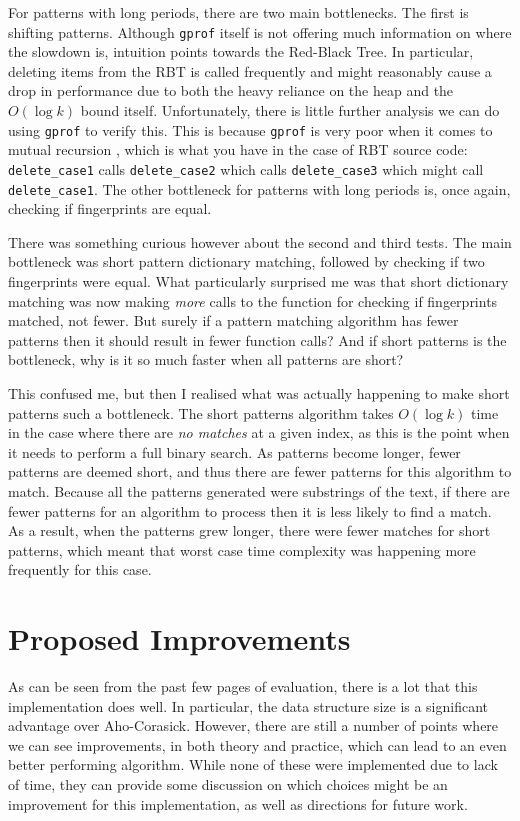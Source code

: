 \documentclass[ %
                    author={Dominic Joseph Moylett},
                    degree={MEng},
                     title={Dictionary Matching with Fingerprints},
                  subtitle={An Empirical Analysis},
                      type={research},
                      year={2015} ]{dissertation}
\begin{document}
For patterns with long periods, there are two main bottlenecks. The first is shifting patterns. Although \texttt{gprof} itself is not offering much information on where the slowdown is, intuition points towards the Red-Black Tree. In particular, deleting items from the RBT is called frequently and might reasonably cause a drop in performance due to both the heavy reliance on the heap and the $O(\log k)$ bound itself. Unfortunately, there is little further analysis we can do using \texttt{gprof} to verify this. This is because \texttt{gprof} is very poor when it comes to mutual recursion \cite{SPE:SPE562}, which is what you have in the case of RBT source code: \texttt{delete\_case1} calls \texttt{delete\_case2} which calls \texttt{delete\_case3} which might call \texttt{delete\_case1}. The other bottleneck for patterns with long periods is, once again, checking if fingerprints are equal.

There was something curious however about the second and third tests. The main bottleneck was short pattern dictionary matching, followed by checking if two fingerprints were equal. What particularly surprised me was that short dictionary matching was now making \textit{more} calls to the function for checking if fingerprints matched, not fewer. But surely if a pattern matching algorithm has fewer patterns then it should result in fewer function calls? And if short patterns is the bottleneck, why is it so much faster when all patterns are short?

This confused me, but then I realised what was actually happening to make short patterns such a bottleneck. The short patterns algorithm takes $O(\log k)$ time in the case where there are \textit{no matches} at a given index, as this is the point when it needs to perform a full binary search. As patterns become longer, fewer patterns are deemed short, and thus there are fewer patterns for this algorithm to match. Because all the patterns generated were substrings of the text, if there are fewer patterns for an algorithm to process then it is less likely to find a match. As a result, when the patterns grew longer, there were fewer matches for short patterns, which meant that worst case time complexity was happening more frequently for this case.

\section{Proposed Improvements}
\label{sec:proposed-improvements}

As can be seen from the past few pages of evaluation, there is a lot that this implementation does well. In particular, the data structure size is a significant advantage over Aho-Corasick. However, there are still a number of points where we can see improvements, in both theory and practice, which can lead to an even better performing algorithm. While none of these were implemented due to lack of time, they can provide some discussion on which choices might be an improvement for this implementation, as well as directions for future work.
\end{document}
